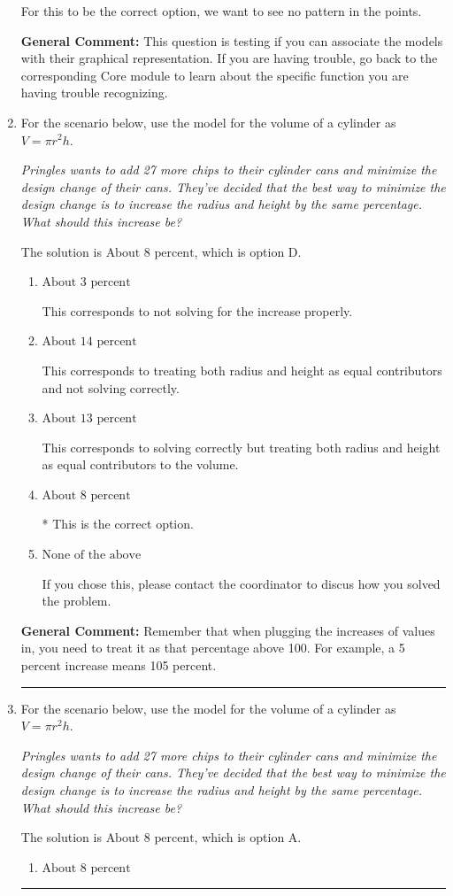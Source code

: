 \documentclass{extbook}[14pt]
\newcommand{\litem}[1]{\item #1

\rule{\textwidth}{0.4pt}}
\begin{document}
\begin{enumerate}
{\begin{enumerate}[label=\Alph*.]
For this to be the correct option, we want to see no pattern in the points.
\end{enumerate}

\textbf{General Comment:} This question is testing if you can associate the models with their graphical representation. If you are having trouble, go back to the corresponding Core module to learn about the specific function you are having trouble recognizing.
}
\litem{
For the scenario below, use the model for the volume of a cylinder as $V = \pi r^2 h$.

\begin{center}
    \textit{ Pringles wants to add 27 \text{percent} more chips to their cylinder cans and minimize the design change of their cans. They've decided that the best way to minimize the design change is to increase the radius and height by the same percentage. What should this increase be? }
\end{center}
The solution is \( \text{About } 8 \text{ percent} \), which is option D.\begin{enumerate}[label=\Alph*.]
\item \( \text{About } 3 \text{ percent} \)

This corresponds to not solving for the increase properly.
\item \( \text{About } 14 \text{ percent} \)

This corresponds to treating both radius and height as equal contributors and not solving correctly.
\item \( \text{About } 13 \text{ percent} \)

This corresponds to solving correctly but treating both radius and height as equal contributors to the volume.
\item \( \text{About } 8 \text{ percent} \)

* This is the correct option.
\item \( \text{None of the above} \)

If you chose this, please contact the coordinator to discus how you solved the problem.
\end{enumerate}

\textbf{General Comment:} Remember that when plugging the increases of values in, you need to treat it as that percentage above 100. For example, a 5 percent increase means 105 percent.
}
\litem{
For the scenario below, use the model for the volume of a cylinder as $V = \pi r^2 h$.

\begin{center}
    \textit{ Pringles wants to add 27 \text{percent} more chips to their cylinder cans and minimize the design change of their cans. They've decided that the best way to minimize the design change is to increase the radius and height by the same percentage. What should this increase be? }
\end{center}
The solution is \( \text{About } 8 \text{ percent} \), which is option A.\begin{enumerate}[label=\Alph*.]
\item \( \text{About } 8 \text{ percent} \)


\end{enumerate}}
\end{enumerate}
\end{document}
